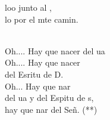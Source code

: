 \documentclass[12pt]{article}
\begin{document}
\begin{multicols*}{2}
\begin{cancion}
	loo junto al ,\\
	lo  por el mte camin.\\\jump\\
	\begin{chorus}%
	Oh.... Hay que nacer del ua\\
	Oh.... Hay que nacer\\
	del Esritu de D. \\
	Oh... Hay que nar\\
	del ua y del Espitu de s,\\
	hay que nar del Señ. (**) \\
	\end{chorus}%
	\jump\\
\end{cancion}%


\end{multicols*}
\end{document}
